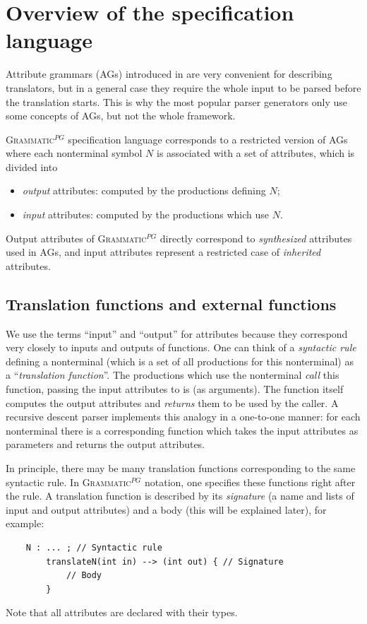 \documentclass{llncs2e/llncs}
\newcommand{\ATF}{\textsc{Grammatic}$^{PG}$}
\begin{document}
\section{Overview of the specification language}\label{Overview}

Attribute grammars (AGs) introduced in \cite{ATG} are very convenient for describing translators, but in a general case they require the whole input to be parsed before the translation starts. This is why the most popular parser generators only use some concepts of AGs, but not the whole framework.

\ATF{} specification language corresponds to a restricted version of AGs where each nonterminal symbol $N$ is associated with a set of attributes, which is divided into
\begin{itemize}
	\item \emph{output} attributes: computed by the productions defining $N$;
	\item \emph{input} attributes: computed by the productions which use $N$.
\end{itemize}
Output attributes of \ATF{} directly correspond to \emph{synthesized} attributes used in AGs, and input attributes represent a restricted case of \emph{inherited} attributes. 

\subsection{Translation functions and external functions}

We use the terms ``input'' and ``output'' for attributes because they correspond very closely to inputs and outputs of functions. One can think of a \emph{syntactic rule} defining a nonterminal (which is a set of all productions for this nonterminal) as a ``\emph{translation function}''. The productions which use the nonterminal \emph{call} this function, passing the input attributes to is (as arguments). The function itself computes the output attributes and \emph{returns} them to be used by the caller. A recursive descent parser implements this analogy in a one-to-one manner: for each nonterminal there is a corresponding function which takes the input attributes as parameters and returns the output attributes. 

In principle, there may be many translation functions corresponding to the same syntactic rule. In \ATF{} notation, one specifies these functions right after the rule. A translation function is described by its \emph{signature} (a name and lists of input and output attributes) and a body (this will be explained later), for example:
\begin{lstlisting}
	N : ... ; // Syntactic rule
		translateN(int in) --> (int out) { // Signature
			// Body
		}
\end{lstlisting}
Note that all attributes are declared with their types. 
\end{document}
